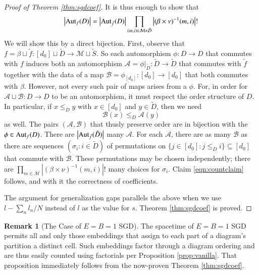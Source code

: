 \documentclass{article}
\theoremstyle{plain}
\theoremstyle{definition}
\newtheorem{rmk}{Remark}
\newcommand{\wabs}[1]{\left|#1\right|}
\newcommand{\Aut}{\text{\textnormal{Aut}}}
\newcommand{\Aa}{\mathcal{A}}
\newcommand{\Bb}{\mathcal{B}}
\newcommand{\Mm}{\mathcal{M}}
\begin{document}
\begin{proof}[Proof of Theorem \ref{thm:sgdcoef}]
            It is thus enough to show that
            \begin{align*} \label{eqn:countclaim}
                \wabs{\Aut_f(D)} = 
                \wabs{\Aut_{\tilde f}(D)}
                \prod_{(m, i) \in \Mm \times \tilde D}
                    \wabs{(\beta \times \nu)^{-1}(m, i)}!
            \end{align*}
            We will show this by a direct bijection.  First, observe that
            $
                f = \beta \sqcup \tilde f:
                    [d_0] \sqcup \tilde D \to \Mm \sqcup \tilde S
            $. 
            So each automorphism $\phi: D\to D$ that commutes with $f$ induces
            both an automorphism
            $
                \Aa = \phi|_{\tilde D}: \tilde D\to \tilde D
            $
            that commutes with $\tilde f$ together with the data of a map
            $
                \Bb = \phi_{[d_0]}: [d_0] \to [d_0] 
            $
            that both commutes with $\beta$.  However, not every such pair of
            maps arises from a $\phi$.  For, in order for $\Aa \sqcup \Bb: D
            \to D$ to be an automorphism, it must respect the order structure
            of $D$.  In particular, if $x\leq_D y$ with $x \in [d_0]$ and $y
            \in \tilde D$, then we need
            $$
                \Bb(x) \leq_D \Aa(y)
            $$
            as well.  The
            pairs $(\Aa, \Bb)$ that thusly preserve order are in bijection with
            the $\phi \in \Aut_f(D)$.  There are $\wabs{\Aut_{\tilde f}(\tilde
            D)}$ many $\Aa$.  For each $\Aa$, there are as many $\Bb$ as there
            are sequences $(\sigma_i: i \in \tilde D)$ of permutations on
            $
                \{j\in [d_0]: j\leq_D i\} \subseteq [d_0]
            $ 
            that commute with $\Bb$.  These permutations may be chosen
            independently; there are 
            $
                \prod_{m\in \Mm}
                    \wabs{(\beta \times \nu)^{-1}(m, i)}!
            $
            many choices for $\sigma_i$.  Claim \ref{eqn:countclaim} follows,
            and with it the correctness of coefficients.
 
            The argument for generalization gaps parallels the above when we
            use $l-\sum_n l_n/N$ instead of $l$ as the value for $s$. 
            Theorem \ref{thm:sgdcoef} is proved.
        \end{proof}

        \begin{rmk}[The Case of $E=B=1$ SGD]
            The spacetime of $E=B=1$ SGD permits all and only those
            embeddings that assign to each part of a diagram's partition  a
            distinct cell.  Such embeddings factor through a diagram
            ordering and are thus easily counted using factorials per
            Proposition \ref{prop:vanilla}.  That proposition immediately
            follows from the now-proven Theorem \ref{thm:sgdcoef}.
        \end{rmk}
\end{document}
